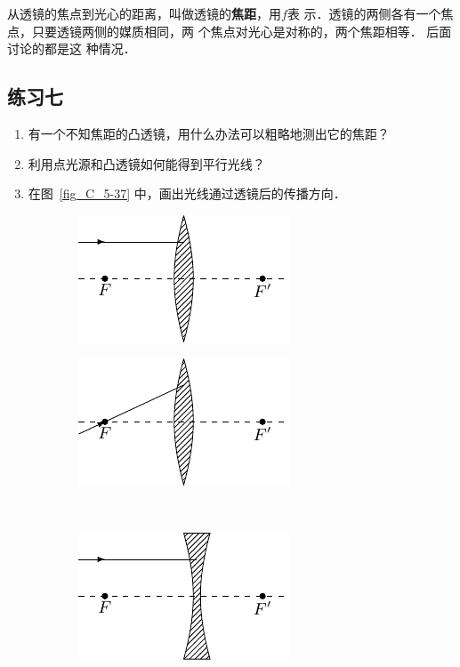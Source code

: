 从透镜的焦点到光心的距离，叫做透镜的\textbf{焦距}，用$f$表
示．透镜的两侧各有一个焦点，只要透镜两侧的媒质相同，两
个焦点对光心是对称的，两个焦距相等．
后面讨论的都是这
种情况．

\subsection*{练习七}
\begin{enumerate}
    \item 有一个不知焦距的凸透镜，用什么办法可以粗略地测出它的焦距？
    \item 利用点光源和凸透镜如何能得到平行光线？
    \item 在图~\ref{fig_C_5-37} 中，画出光线通过透镜后的传播方向．
\end{enumerate}

\begin{figure}[htbp]
    \centering
    \begin{subfigure}{0.4\linewidth}
        \centering
        \includegraphics{fig/C/5-37a.pdf}
        \caption{}\label{fig_C_5-37a}
    \end{subfigure}
    \hfil
    \begin{subfigure}{0.4\linewidth}
        \centering
        \includegraphics{fig/C/5-37b.pdf}
        \caption{}\label{fig_C_5-37b}
    \end{subfigure}
    \\
    \begin{subfigure}{0.3\linewidth}
        \centering
        \includegraphics{fig/C/5-37c.pdf}

\end{subfigure}
\end{figure}
